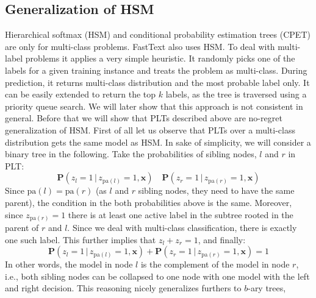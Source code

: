 \documentclass{article}
\renewcommand{\vec}[1]{\boldsymbol{#1}}
\newcommand{\bx}{\vec{x}}
\newcommand{\heta}{\hat{\eta}}
\newcommand{\pa}[1]{\mathrm{pa}(#1)}
\newcommand{\Path}[1]{\mathrm{Path}(#1)}
\newcommand{\Children}[1]{\mathrm{Ch}(#1)}
\newcommand{\prob}{\mathbf{P}}
\newcommand{\given}{\, | \,}
\newcommand{\sectionBefore}{-0pt}
\newcommand{\sectionAfter}{-0pt}
\begin{document}


\vspace{\sectionBefore}
\subsection{Generalization of HSM}
\label{sec:online_PLTs}
\vspace{\sectionAfter}

Hierarchical softmax (HSM) and conditional probability estimation trees (CPET) are only for multi-class problems. 
FastText also uses HSM. To deal with multi-label problems it applies a very simple heuristic. It randomly picks one of the labels for a given training instance and treats the problem as multi-class. During prediction, it returns multi-class distribution and the most probable label only. It can be easily extended to return the top $k$ labels, as the tree is traversed using a priority queue search. We will later show that this approach is not consistent in general. Before that we will show that PLTs described above are no-regret generalization of HSM. First of all let us observe that PLTs over a multi-class distribution gets the same model as HSM. In sake of simplicity, we will consider a binary tree in the following.  
Take the probabilities of sibling nodes, $l$ and $r$ in PLT:
$$
\prob(z_l = 1 \given z_{\pa{l}} =1, \bx) \quad \prob(z_r = 1 \given z_{\pa{r}} =1, \bx)
$$
Since $\pa{l} = \pa{r}$ (as $l$ and $r$ sibling nodes, they need to have the same parent), the condition in the both probabilities above is the same. Moreover, since $z_{\pa{r}} =1$ there is at least one active label in the subtree rooted in the parent of $r$ and $l$. Since we deal with multi-class classification, there is exactly one such label. This further implies that $z_l + z_r = 1$, and finally: 
$$
\prob(z_l = 1 \given z_{\pa{l}} =1, \bx) + \prob(z_r = 1 \given z_{\pa{r}} =1, \bx) = 1 
$$
In other words, the model in node $l$ is the complement of the model in node $r$, i.e., both sibling nodes can be collapsed to one node with one model with the left and right decision. This reasoning nicely generalizes furthers to $b$-ary trees,
\end{document}
